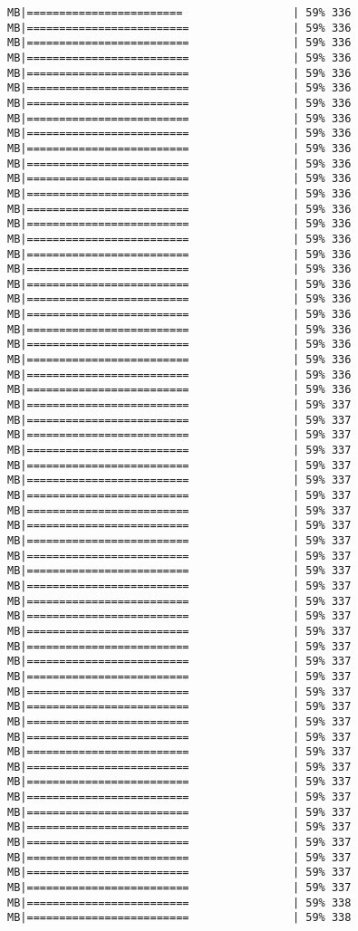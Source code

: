 \documentclass[
]{article}
\begin{document}
\begin{verbatim}
MB|========================                 | 59% 336 MB|=========================                | 59% 336 MB|=========================                | 59% 336 MB|=========================                | 59% 336 MB|=========================                | 59% 336 MB|=========================                | 59% 336 MB|=========================                | 59% 336 MB|=========================                | 59% 336 MB|=========================                | 59% 336 MB|=========================                | 59% 336 MB|=========================                | 59% 336 MB|=========================                | 59% 336 MB|=========================                | 59% 336 MB|=========================                | 59% 336 MB|=========================                | 59% 336 MB|=========================                | 59% 336 MB|=========================                | 59% 336 MB|=========================                | 59% 336 MB|=========================                | 59% 336 MB|=========================                | 59% 336 MB|=========================                | 59% 336 MB|=========================                | 59% 336 MB|=========================                | 59% 336 MB|=========================                | 59% 336 MB|=========================                | 59% 336 MB|=========================                | 59% 336 MB|=========================                | 59% 337 MB|=========================                | 59% 337 MB|=========================                | 59% 337 MB|=========================                | 59% 337 MB|=========================                | 59% 337 MB|=========================                | 59% 337 MB|=========================                | 59% 337 MB|=========================                | 59% 337 MB|=========================                | 59% 337 MB|=========================                | 59% 337 MB|=========================                | 59% 337 MB|=========================                | 59% 337 MB|=========================                | 59% 337 MB|=========================                | 59% 337 MB|=========================                | 59% 337 MB|=========================                | 59% 337 MB|=========================                | 59% 337 MB|=========================                | 59% 337 MB|=========================                | 59% 337 MB|=========================                | 59% 337 MB|=========================                | 59% 337 MB|=========================                | 59% 337 MB|=========================                | 59% 337 MB|=========================                | 59% 337 MB|=========================                | 59% 337 MB|=========================                | 59% 337 MB|=========================                | 59% 337 MB|=========================                | 59% 337 MB|=========================                | 59% 337 MB|=========================                | 59% 337 MB|=========================                | 59% 337 MB|=========================                | 59% 337 MB|=========================                | 59% 337 MB|=========================                | 59% 338 MB|=========================                | 59% 338 
\end{verbatim}
\end{document}
